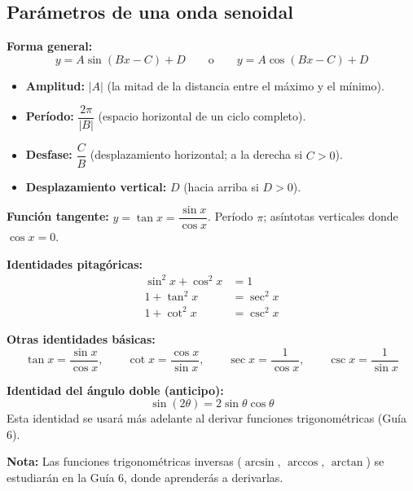 \documentclass[12pt, letterpaper]{article}
\begin{document}
\subsection{Parámetros de una onda senoidal}

\begin{cuadroteoria}
  \textbf{Forma general:}
  $$y = A\sin(Bx - C) + D \qquad \text{o} \qquad y = A\cos(Bx - C) + D$$

  \begin{itemize}[leftmargin=*]
    \item \textbf{Amplitud:} $|A|$ (la mitad de la distancia entre el máximo y el mínimo).
    \item \textbf{Período:} $\dfrac{2\pi}{|B|}$ (espacio horizontal de un ciclo completo).
    \item \textbf{Desfase:} $\dfrac{C}{B}$ (desplazamiento horizontal; a la derecha si $C > 0$).
    \item \textbf{Desplazamiento vertical:} $D$ (hacia arriba si $D > 0$).
  \end{itemize}

  \textbf{Función tangente:} $y = \tan x = \dfrac{\sin x}{\cos x}$. Período $\pi$; asíntotas verticales donde $\cos x = 0$.
\end{cuadroteoria}

\begin{cuadrosolucion}
  \textbf{Identidades pitagóricas:}
  \begin{align*}
    \sin^2 x + \cos^2 x & = 1        \\
    1 + \tan^2 x        & = \sec^2 x \\
    1 + \cot^2 x        & = \csc^2 x
  \end{align*}

  \textbf{Otras identidades básicas:}
  $$\tan x = \frac{\sin x}{\cos x}, \qquad \cot x = \frac{\cos x}{\sin x}, \qquad \sec x = \frac{1}{\cos x}, \qquad \csc x = \frac{1}{\sin x}$$

  \textbf{Identidad del ángulo doble (anticipo):}
  $$\sin(2\theta) = 2\sin\theta\cos\theta$$
  Esta identidad se usará más adelante al derivar funciones trigonométricas (Guía 6).
\end{cuadrosolucion}

\begin{cuadroinfo}
  \textbf{Nota:} Las funciones trigonométricas inversas ($\arcsin$, $\arccos$, $\arctan$) se estudiarán en la Guía 6, donde aprenderás a derivarlas.
\end{cuadroinfo}
\end{document}

